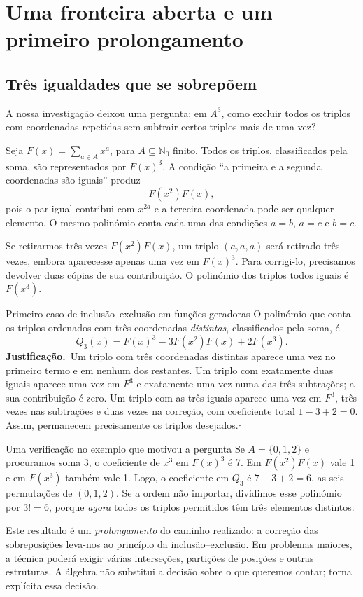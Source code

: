 \documentclass[11pt,a4paper,oneside]{book}
\newcommand{\prova}{\textbf{Justificação.}\ }
\newcommand{\fimprova}{\hfill$\square$}
\newcommand{\Nzero}{\mathbb{N}_0}
\begin{document}
\part{Uma fronteira aberta e um primeiro prolongamento}
\chapter{Três igualdades que se sobrepõem}
A nossa investigação deixou uma pergunta: em $A^3$, como excluir todos os triplos com coordenadas repetidas sem subtrair certos triplos mais de uma vez?

Seja $F(x)=\sum_{a\in A}x^a$, para $A\subseteq\Nzero$ finito. Todos os triplos, classificados pela soma, são representados por $F(x)^3$. A condição ``a primeira e a segunda coordenadas são iguais'' produz
\[F(x^2)F(x),\]
pois o par igual contribui com $x^{2a}$ e a terceira coordenada pode ser qualquer elemento. O mesmo polinómio conta cada uma das condições $a=b$, $a=c$ e $b=c$.

Se retirarmos três vezes $F(x^2)F(x)$, um triplo $(a,a,a)$ será retirado três vezes, embora aparecesse apenas uma vez em $F(x)^3$. Para corrigi-lo, precisamos devolver duas cópias de sua contribuição. O polinómio dos triplos todos iguais é $F(x^3)$.
\begin{teoremabox}{Primeiro caso de inclusão--exclusão em funções geradoras}
O polinómio que conta os triplos ordenados com três coordenadas \emph{distintas}, classificados pela soma, é
\[\boxed{Q_3(x)=F(x)^3-3F(x^2)F(x)+2F(x^3)}.\]
\prova Um triplo com três coordenadas distintas aparece uma vez no primeiro termo e em nenhum dos restantes. Um triplo com exatamente duas iguais aparece uma vez em $F^3$ e exatamente uma vez numa das três subtrações; a sua contribuição é zero. Um triplo com as três iguais aparece uma vez em $F^3$, três vezes nas subtrações e duas vezes na correção, com coeficiente total $1-3+2=0$. Assim, permanecem precisamente os triplos desejados.\fimprova
\end{teoremabox}
\begin{observacaobox}{Uma verificação no exemplo que motivou a pergunta}
Se $A=\{0,1,2\}$ e procuramos soma 3, o coeficiente de $x^3$ em $F(x)^3$ é 7. Em $F(x^2)F(x)$ vale 1 e em $F(x^3)$ também vale 1. Logo, o coeficiente em $Q_3$ é $7-3+2=6$, as seis permutações de $(0,1,2)$. Se a ordem não importar, dividimos esse polinómio por $3!=6$, porque \emph{agora} todos os triplos permitidos têm três elementos distintos.
\end{observacaobox}
Este resultado é um \emph{prolongamento} do caminho realizado: a correção das sobreposições leva-nos ao princípio da inclusão--exclusão. Em problemas maiores, a técnica poderá exigir várias interseções, partições de posições e outras estruturas. A álgebra não substitui a decisão sobre o que queremos contar; torna explícita essa decisão.
\end{document}
